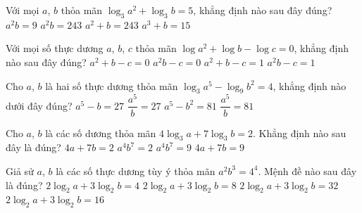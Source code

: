 \begin{ex}%
	Với mọi $a$,  $b$ thỏa mãn $\log_3a^2+\log_3b=5$, khẳng định nào sau đây đúng?
	\choice 
		 {$a^2b=9$}
		{\True $a^2b=243$} 
		 {$a^2+b=243$}
		 {$a^3+b=15$}
\end{ex}

\begin{ex}%
	Với mọi số thực dương $a$, $b$, $c$ thỏa mãn $\log a^2+\log b-\log  c=0$, khẳng định nào sau đây đúng?
	 \choice
		{$a^2+b-c=0$} 
		{\True  $a^2b-c=0$}
		{$a^2+b-c=1$} 
		 {$a^2b-c=1$}
\end{ex}

\begin{ex}%
	Cho $a$, $b$ là hai số thực dương thỏa mãn $\log_3a^5-\log_9b^2=4$, khẳng định  nào dưới đây đúng?
	 \choice
		 {$a^5-b=27$}
		 {$\dfrac{a^5}{b}=27$}
		 {$a^5-b^2=81$}
		{\True  $\dfrac{a^5}{b}=81$}
\end{ex}

\begin{ex}%
	Cho $a$, $b$ là các số  dương thỏa mãn $4\log_3a+7\log_3b=2$. Khẳng định nào sau đây là đúng?
	 \choice
		 {$4a+7b=2$}
		{$a^4b^7=2$} 
		{\True $a^4b^7=9$} 
		 {$4a+7b=9$}
\end{ex}

\begin{ex}%
	Giả sử $a$, $b$ là các số thực dương tùy ý thỏa mãn $a^2b^3=4^4$. Mệnh đề  nào sau đây là đúng?
	 \choice
		 {$2\log_2a+3\log_2b=4$}
		{\True  $2\log_2a+3\log_2b=8$}
		{$2\log_2a+3\log_2b=32$} 
		{$2\log_2a+3\log_2b=16$} 
\end{ex}

